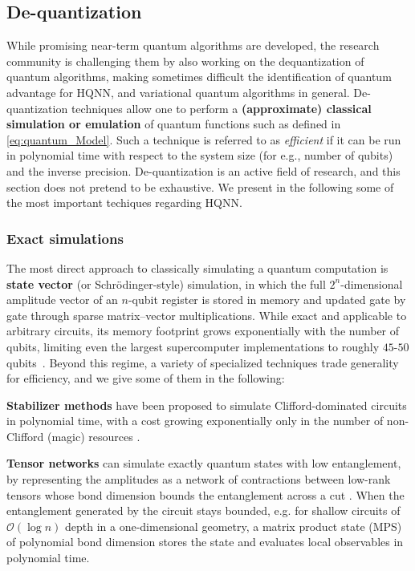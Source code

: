 \documentclass[aps,10pt,groupedaddress,prx,superscriptaddress,twocolumn,balancelastpage, tightenlines]{revtex4-2}
\theoremstyle{plain}  %
\begin{document}
\subsection{De-quantization}\label{subsec:Dequantization}

While promising near-term quantum algorithms are developed, the research community is challenging them by also working on the dequantization of quantum algorithms, making sometimes difficult the identification of quantum advantage for HQNN, and variational quantum algorithms in general. De-quantization techniques \cite{masot-llima_prospects_2025} allow one to perform a \textbf{(approximate) classical simulation or emulation} of quantum functions such as defined in \autoref{eq:quantum_Model}. Such a technique is referred to as \emph{efficient} if it can be run in polynomial time with respect to the system size (for e.g., number of qubits) and the inverse precision. De-quantization is an active field of research, and this section does not pretend to be exhaustive. We present in the following some of the most important techiques regarding HQNN.

    \subsubsection*{Exact simulations}

\noindent The most direct approach to classically simulating a quantum computation is \textbf{state vector} (or Schr\"odinger-style) simulation, in which the full $2^n$-dimensional amplitude vector of an $n$-qubit register is stored in memory and updated gate by gate through sparse matrix--vector multiplications. While exact and applicable to arbitrary circuits, its memory footprint grows exponentially with the number of qubits, limiting even the largest supercomputer implementations to roughly $45$-$50$ qubits~\cite{de_raedt_massively_2019, haner_05_2017}. Beyond this regime, a variety of specialized techniques trade generality for efficiency, and we give some of them in the following:

\textbf{Stabilizer methods} have been proposed to simulate Clifford-dominated circuits in polynomial time, with a cost growing exponentially only in the number of non-Clifford (magic) resources \cite{aaronson2004improved, bravyi_improved_2016}.

\textbf{Tensor networks} can simulate exactly quantum states with low entanglement, by representing the amplitudes as a network of contractions between low-rank tensors whose bond dimension bounds the entanglement across a cut \cite{berezutskii_tensor_2025}. When the entanglement generated by the circuit stays bounded, e.g. for shallow circuits of $\mathcal{O}(\log n)$ depth in a one-dimensional geometry, a matrix product state (MPS) of polynomial bond dimension stores the state and evaluates local observables in polynomial time.
\end{document}
